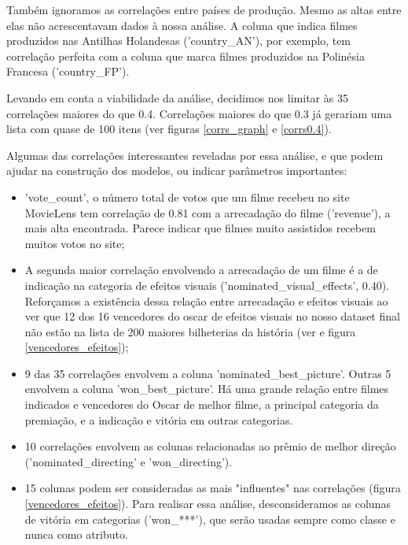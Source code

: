             Também ignoramos as correlações entre países de produção. Mesmo as altas entre elas não acrescentavam dados à nossa análise. A coluna que indica filmes produzidos nas Antilhas Holandesas ('country\_AN'), por exemplo, tem correlação perfeita com a coluna que marca filmes produzidos na Polinésia Francesa ('country\_FP').\par

            Levando em conta a viabilidade da análise, decidimos nos limitar às 35 correlações maiores do que 0.4. Correlações maiores do que 0.3 já gerariam uma lista com quase de 100 itens (ver figuras \ref{corrs_graph} e \ref{corrs0.4}). \par

            Algumas das correlações interessantes reveladas por essa análise, e que podem ajudar na construção dos modelos, ou indicar parâmetros importantes:

            \begin{itemize}

            \item 'vote\_count', o número total de votos que um filme recebeu no site MovieLens tem correlação de 0.81 com a arrecadação do filme ('revenue'), a mais alta encontrada. Parece indicar que filmes muito assistidos recebem muitos votos no site;

            \item A segunda maior correlação envolvendo a arrecadação de um filme é a de indicação na categoria de efeitos visuais ('nominated\_visual\_effects', 0.40). Reforçamos a existência dessa relação entre arrecadação e efeitos visuais ao ver que 12 dos 16 vencedores do oscar de efeitos visuais no nosso dataset final não estão na lista de 200 maiores bilheterias da história (ver  e figura \ref{vencedores_efeitos});

            \item 9 das 35 correlações envolvem a coluna 'nominated\_best\_picture'. Outras 5 envolvem a coluna 'won\_best\_picture'. Há uma grande relação entre filmes indicados e vencedores do Oscar de melhor filme, a principal categoria da premiação, e a indicação e vitória em outras categorias.

            \item 10 correlações envolvem as colunas relacionadas ao prêmio de melhor direção ('nominated\_directing' e 'won\_directing').

            \item 15 colunas podem ser consideradas as mais "influentes" nas correlações (figura \ref{vencedores_efeitos}). Para realisar essa análise, desconsideramos as colunas de vitória em categorias ('won\_***'), que serão usadas sempre como classe e nunca como atributo.

            \end{itemize}

